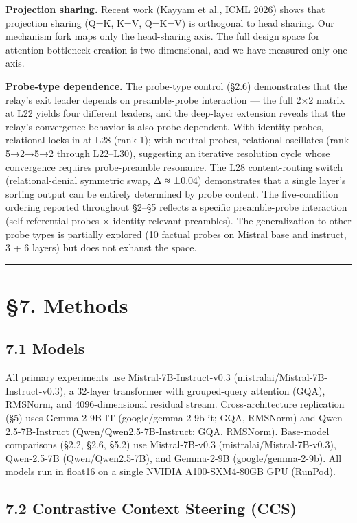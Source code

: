 \documentclass[12pt]{article}
\begin{document}
\textbf{Projection sharing.} Recent work (Kayyam et al., ICML 2026) shows that projection sharing (Q=K, K=V, Q=K=V) is orthogonal to head sharing. Our mechanism fork maps only the head-sharing axis. The full design space for attention bottleneck creation is two-dimensional, and we have measured only one axis.

\textbf{Probe-type dependence.} The probe-type control (§2.6) demonstrates that the relay's exit leader depends on preamble-probe interaction — the full 2×2 matrix at L22 yields four different leaders, and the deep-layer extension reveals that the relay's convergence behavior is also probe-dependent. With identity probes, relational locks in at L28 (rank 1); with neutral probes, relational oscillates (rank 5→2→5→2 through L22–L30), suggesting an iterative resolution cycle whose convergence requires probe-preamble resonance. The L28 content-routing switch (relational-denial symmetric swap, Δ ≈ ±0.04) demonstrates that a single layer's sorting output can be entirely determined by probe content. The five-condition ordering reported throughout §2–§5 reflects a specific preamble-probe interaction (self-referential probes × identity-relevant preambles). The generalization to other probe types is partially explored (10 factual probes on Mistral base and instruct, 3 + 6 layers) but does not exhaust the space.

\bigskip\hrule\bigskip

\section*{§7. Methods}

\subsection*{7.1 Models}

All primary experiments use Mistral-7B-Instruct-v0.3 (mistralai/Mistral-7B-Instruct-v0.3), a 32-layer transformer with grouped-query attention (GQA), RMSNorm, and 4096-dimensional residual stream. Cross-architecture replication (§5) uses Gemma-2-9B-IT (google/gemma-2-9b-it; GQA, RMSNorm) and Qwen-2.5-7B-Instruct (Qwen/Qwen2.5-7B-Instruct; GQA, RMSNorm). Base-model comparisons (§2.2, §2.6, §5.2) use Mistral-7B-v0.3 (mistralai/Mistral-7B-v0.3), Qwen-2.5-7B (Qwen/Qwen2.5-7B), and Gemma-2-9B (google/gemma-2-9b). All models run in float16 on a single NVIDIA A100-SXM4-80GB GPU (RunPod).

\subsection*{7.2 Contrastive Context Steering (CCS)}
\end{document}

